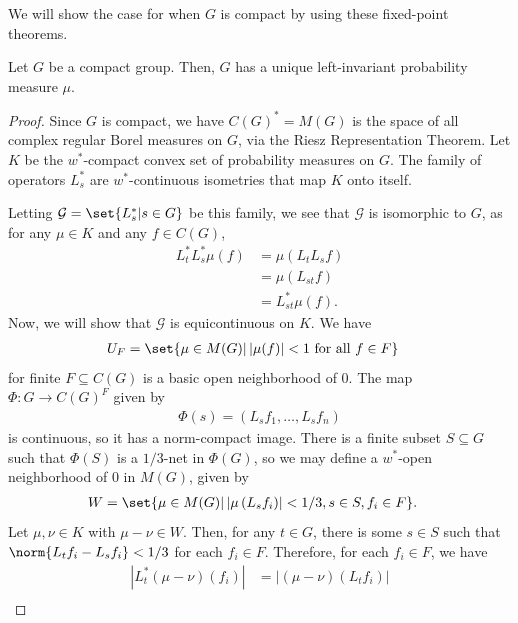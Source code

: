 \documentclass[10pt]{mypackage}
\begin{document}
We will show the case for when $G$ is compact by using these fixed-point theorems.
\begin{theorem}
  Let $G$ be a compact group. Then, $G$ has a unique left-invariant probability measure $\mu$. 
\end{theorem}
\begin{proof}
  Since $G$ is compact, we have $C(G)^{\ast} = M(G)$ is the space of all complex regular Borel measures on $G$, via the Riesz Representation Theorem. Let $K$ be the $w^{\ast}$-compact convex set of probability measures on $G$. The family of operators $L_s^{\ast}$ are $w^{\ast}$-continuous isometries that map $K$ onto itself.

  Letting $\mathcal{G} = \set{L_s^{\ast} | s\in G}$ be this family, we see that $\mathcal{G}$ is isomorphic to $G$, as for any $\mu\in K$ and any $f\in C(G)$,
  \begin{align*}
    L_t^{\ast}L_s^{\ast}\mu(f) &= \mu\left( L_tL_sf \right)\\
                               &= \mu\left( L_{st}f \right)\\
                               &= L_{st}^{\ast}\mu(f).
  \end{align*}
  Now, we will show that $\mathcal{G}$ is equicontinuous on $K$. We have
  \begin{align*}
    U_F &= \set{\mu\in M(G) | \left\vert \mu(f) \right\vert < 1\text{ for all }f\in F}
  \end{align*}
  for finite $F\subseteq C(G)$ is a basic open neighborhood of $0$. The map $\Phi\colon G\rightarrow C(G)^{F}$ given by
  \begin{align*}
    \Phi(s) = \left( L_sf_1,\dots,L_sf_n \right)
  \end{align*}
  is continuous, so it has a norm-compact image. There is a finite subset $S\subseteq G$ such that $\Phi(S)$ is a $1/3$-net in $\Phi(G)$, so we may define a $w^{\ast}$-open neighborhood of $0$ in $M(G)$, given by
  \begin{align*}
    W &= \set{\mu\in M(G) | \left\vert \mu\left( L_sf_i \right) \right\vert < 1/3, s\in S, f_i\in F}.
  \end{align*}
  Let $\mu,\nu\in K$ with $\mu-\nu\in W$. Then, for any $t\in G$, there is some $s\in S$ such that $\norm{L_tf_i-L_sf_i} < 1/3$ for each $f_i\in F$. Therefore, for each $f_i\in F$, we have
  \begin{align*}
    \left\vert L_t^{\ast}\left( \mu-\nu \right)\left(f_i\right) \right\vert &= \left\vert \left( \mu-\nu \right)\left( L_tf_i \right) \right\vert\\

\end{align*}
\end{proof}
\end{document}
